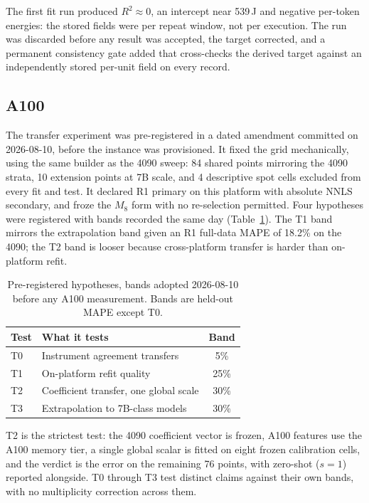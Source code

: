 \documentclass[conference]{IEEEtran}
\begin{document}
The first fit run produced $R^2 \approx 0$, an intercept near 539\,J and
negative per-token energies: the stored fields were per repeat window, not
per execution. The run was discarded before any result was accepted, the
target corrected, and a permanent consistency gate added that cross-checks
the derived target against an independently stored per-unit field on every
record.

\subsection{A100}

The transfer experiment was pre-registered in a dated amendment committed on
2026-08-10, before the instance was provisioned. It fixed the grid
mechanically, using the same builder as the 4090 sweep: 84 shared points
mirroring the 4090 strata, 10 extension points at 7B scale, and 4
descriptive spot cells excluded from every fit and test. It declared R1
primary on this platform with absolute NNLS secondary, and froze the $M_8$
form with no re-selection permitted. Four hypotheses were registered with
bands recorded the same day (Table~\ref{tab:prereg}). The T1 band mirrors
the extrapolation band given an R1 full-data MAPE of 18.2\% on the 4090;
the T2 band is looser because cross-platform transfer is harder than
on-platform refit.

\begin{table}[t]
\caption{Pre-registered hypotheses, bands adopted 2026-08-10 before any A100
measurement. Bands are held-out MAPE except T0.}
\label{tab:prereg}
\centering
\small
\begin{tabular}{llc}
\toprule
Test & What it tests & Band \\
\midrule
T0 & Instrument agreement transfers & 5\% \\
T1 & On-platform refit quality & 25\% \\
T2 & Coefficient transfer, one global scale & 30\% \\
T3 & Extrapolation to 7B-class models & 30\% \\
\bottomrule
\end{tabular}
\end{table}

T2 is the strictest test: the 4090 coefficient vector is frozen, A100
features use the A100 memory tier, a single global scalar is fitted on
eight frozen calibration cells, and the verdict is the error on the
remaining 76 points, with zero-shot ($s=1$) reported alongside. T0 through
T3 test distinct claims against their own bands, with no multiplicity
correction across them.
\end{document}
